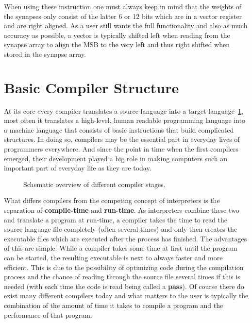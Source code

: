 When using these instruction one must always keep in mind that the weights of the synapses only consist of the latter 6 or 12 bits which are in a vector register and are right aligned.
As a user still wants the full functionality and also as much accuracy as possible, a vector is typically shifted left when reading from the synapse array to  align the MSB to the very left and thus right shifted when stored in the synapse array.


\section{Basic Compiler Structure}
\label{section:compiler}
At its core every compiler translates a source-language into a target-language~\ref{fig:compiler}, most often it translates a high-level, human readable programming language into a machine language that consists of basic instructions that build complicated structures.
In doing so, compilers may be the essential part in everyday lives of programmers everywhere.
And since the point in time when the first compilers emerged, their development played a big role in making computers such an important part of everyday life as they are today.

\begin{figure}
    
    \caption{\label{fig:compiler} Schematic overview of different compiler stages.}
\end{figure}

What differs compilers from the competing concept of interpreters is the separation of \textbf{compile-time} and \textbf{run-time}.
As interpreters combine these two and translate a program at run-time, a compiler takes the time to read the source-language file completely (often several times) and only then creates the executable files which are executed after the process has finished.
The advantages of this are simple:
While a compiler takes some time at first until the program can be started, the resulting executable is next to always faster and more efficient.
This is due to the possibility of optimizing code during the compilation process and the chance of reading through the source file several times if this is needed (with each time the code is read being called a \textbf{pass}).
Of course there do exist many different compilers today and what matters to the user is typically the combination of the amount of time it takes to compile a program and the performance of that program.

